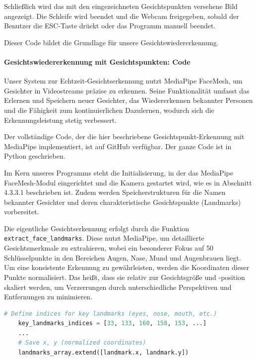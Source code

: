 Schließlich wird das mit den eingezeichneten Gesichtspunkten versehene Bild angezeigt. Die Schleife wird beendet und die Webcam freigegeben, sobald der Benutzer die ESC-Taste drückt oder das Programm manuell beendet.

Dieser Code bildet die Grundlage für unsere Gesichtswiedererkennung.

\paragraph{Gesichtswiedererkennung mit Gesichtspunkten: Code} 

Unser System zur Echtzeit-Gesichtserkennung nutzt MediaPipe FaceMesh, um Gesichter in Videostreams präzise zu erkennen.
Seine Funktionalität umfasst das Erlernen und Speichern neuer Gesichter, das Wiedererkennen bekannter Personen und die Fähigkeit zum kontinuierlichen Dazulernen, wodurch sich die Erkennungsleistung stetig verbessert.

Der vollständige Code, der die hier beschriebene Gesichtspunkt-Erkennung mit MediaPipe implementiert, ist auf GitHub \cite{github_yolo} verfügbar.
Der ganze Code ist in Python geschrieben.

Im Kern unseres Programms steht die Initialisierung, in der das MediaPipe FaceMesh-Modul eingerichtet und die Kamera gestartet wird, wie es in Abschnitt 4.3.3.1 beschrieben ist.
Zudem werden Speicherstrukturen für die Namen bekannter Gesichter und deren charakteristische Gesichtspunkte (Landmarks) vorbereitet.

Die eigentliche Gesichtserkennung erfolgt durch die Funktion \texttt{extract\_face\_landmarks}. Diese nutzt MediaPipe, um detaillierte Gesichtsmerkmale zu extrahieren, wobei ein besonderer Fokus auf 50 Schlüsselpunkte in den Bereichen Augen, Nase, Mund und Augenbrauen liegt.
Um eine konsistente Erkennung zu gewährleisten, werden die Koordinaten dieser Punkte normalisiert. Das heißt, dass sie relativ zur Gesichtsgröße und -position skaliert werden, um Verzerrungen durch unterschiedliche Perspektiven und Entfernungen zu minimieren.
\begin{lstlisting}[language=Python, caption={Extrahieren und Normalisierung der wichtigsten Gesichtspunkte}, label={lst:mediapipe_extract}, inputencoding=utf8]
    # Define indices for key landmarks (eyes, nose, mouth, etc.)
    key_landmarks_indices = [33, 133, 160, 158, 153, ...] 
    ...
    # Save x, y (normalized coordinates)
    landmarks_array.extend([landmark.x, landmark.y]) 
\end{lstlisting}

